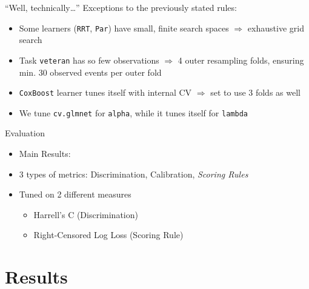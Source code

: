 \documentclass[aspectratio=169,12pt]{beamer}
\providecommand{\tightlist}{%
  \setlength{\itemsep}{2pt}\setlength{\parskip}{0pt}}
\begin{document}
\begin{frame}[fragile]{``Well, technically\ldots{}''}
\label{well-technically}
Exceptions to the previously stated rules:

\vfill

\pause

\begin{itemize}[<+->]
\tightlist
\item
  Some learners (\texttt{RRT}, \texttt{Par}) have small, finite search
  spaces \(\Rightarrow\) exhaustive grid search
\item
  Task \texttt{veteran} has so few observations \(\Rightarrow\) 4 outer
  resampling folds, ensuring min. 30 observed events per outer fold
\item
  \texttt{CoxBoost} learner tunes itself with internal CV
  \(\Rightarrow\) set to use 3 folds as well
\item
  We tune \texttt{cv.glmnet} for \texttt{alpha}, while it tunes itself
  for \texttt{lambda}
\end{itemize}
\end{frame}

\begin{frame}{Evaluation}
\label{evaluation}
\begin{itemize}[<+->]
\tightlist
\item
  Main Results:

\item
  3 types of metrics: Discrimination, Calibration, \emph{Scoring Rules}
\item
  Tuned on 2 different measures

  \begin{itemize}[<+->]
  \tightlist
  \item
    Harrell's C (Discrimination)
  \item
    Right-Censored Log Loss (Scoring Rule)
  \end{itemize}
\end{itemize}
\end{frame}

\section{Results}\label{results}
\end{document}
